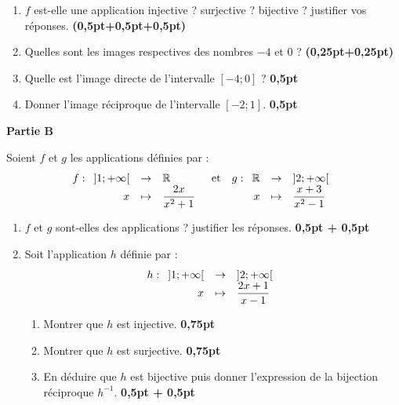 \documentclass[12pt,a4paper]{article}
\begin{document}
\begin{enumerate}
    \item $f$ est-elle une application injective ? surjective ? bijective ? justifier vos réponses. \hfill \textbf{(0,5pt+0,5pt+0,5pt)}
    \item Quelles sont les images respectives des nombres $-4$ et $0$ ? \hfill \textbf{(0,25pt+0,25pt)}
    \item Quelle est l'image directe de l'intervalle $[-4; 0]$ ? \hfill \textbf{0,5pt}
    \item Donner l'image réciproque de l'intervalle $[-2; 1]$. \hfill \textbf{0,5pt}
\end{enumerate}

\vspace{0.3em}
\noindent\textbf{Partie B}

Soient $f$ et $g$ les applications définies par :
\[
f : \begin{array}[t]{rcl}
    ]1; +\infty[ & \to & \mathbb{R} \\
    x & \mapsto & \dfrac{2x}{x^2+1}
\end{array}
\quad \text{et} \quad
g : \begin{array}[t]{rcl}
    \mathbb{R} & \to & ]2; +\infty[ \\
    x & \mapsto & \dfrac{x+3}{x^2-1}
\end{array}
\]

\begin{enumerate}
    \item $f$ et $g$ sont-elles des applications ? justifier les réponses. \hfill \textbf{0,5pt + 0,5pt}
    \item Soit l'application $h$ définie par :
    \[
    h : \begin{array}[t]{rcl}
        ]1; +\infty[ & \to & ]2; +\infty[ \\
        x & \mapsto & \dfrac{2x + 1}{x - 1}
    \end{array}
    \]
    \begin{enumerate}
        \item Montrer que $h$ est injective. \hfill \textbf{0,75pt}
        \item Montrer que $h$ est surjective. \hfill \textbf{0,75pt}
        \item En déduire que $h$ est bijective puis donner l'expression de la bijection réciproque $h^{-1}$. \hfill \textbf{0,5pt + 0,5pt}
    \end{enumerate}
\end{enumerate}
\end{document}
